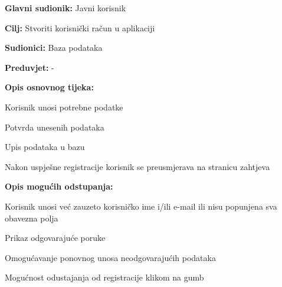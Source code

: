 					\noindent {}
					\begin{packed_item}
						
						\item \textbf{Glavni sudionik: }Javni korisnik
						\item  \textbf{Cilj:} Stvoriti korisnički račun u aplikaciji
						\item  \textbf{Sudionici:} Baza podataka
						\item  \textbf{Preduvjet:} -
						\item  \textbf{Opis osnovnog tijeka:}
						
						\item[] \begin{packed_enum}
							
							\item Korisnik unosi potrebne podatke
							\item Potvrda unesenih podataka
							\item Upis podataka u bazu
							\item Nakon uspješne registracije korisnik se preusmjerava na stranicu zahtjeva
						\end{packed_enum}
						
						\item  \textbf{Opis mogućih odstupanja:}
						
						\item[] \begin{packed_item}
							
							\item[1.a] Korisnik unosi već zauzeto korisničko ime i/ili e-mail ili nisu popunjena sva obavezna polja
							\item[] \begin{packed_enum}
								
								\item Prikaz odgovarajuće poruke
								\item Omogućavanje ponovnog unosa neodgovarajućih podataka
								
							\end{packed_enum}
							
							\item[4.a] Mogućnost odustajanja od registracije klikom na gumb
							
						\end{packed_item}
					\end{packed_item}
				

